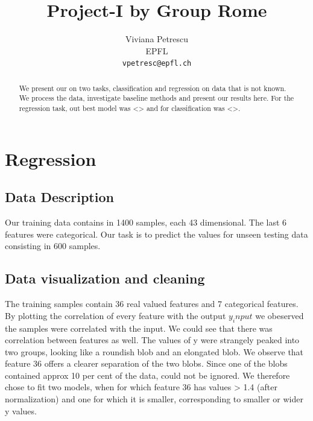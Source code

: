 \documentclass{article} %
\title{Project-I by Group Rome}
\author{
Viviana Petrescu\\
EPFL \\
\texttt{vpetresc@epfl.ch} \\
}
\begin{document}
\maketitle

\begin{abstract}
We present our on two tasks, classification and regression on data that is not known. We process the data, investigate baseline methods and present our results here.
For the regression task, out best model was <> and for classification was <>.
\end{abstract}

\section{Regression}
\subsection{Data Description}
Our training data contains in 1400 samples, each 43 dimensional.
The last 6 features were categorical. Our task is to predict the values for unseen testing data consisting in 600 samples. 

\subsection{Data visualization and cleaning}
The training samples contain 36 real valued features and 7 categorical features. 
By plotting the correlation of every feature with the output $y_input$ we obeserved the samples were correlated with the input.
We could see that there was correlation between features as well.
The values of y were strangely peaked into two groups, looking like a roundish blob and an elongated blob.
We observe that feature 36 offers a clearer separation of the two blobs.
Since one of the blobs contained approx 10 per cent of the data, could not be ignored. We therefore chose to fit two models, when for which 
feature 36 has values > 1.4 (after normalization) and one for which it is smaller, corresponding to smaller or wider y values. 

\begin{figure}[!h]
\center
{}
\hfill
\caption{}
\end{figure}
\end{document}
